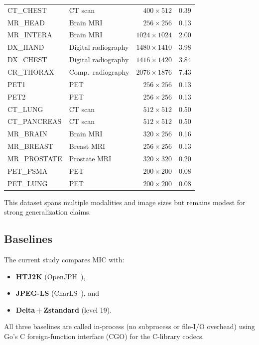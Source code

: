 \documentclass[journal]{IEEEtran}
\begin{document}
\begin{table}[htbp]
\begin{tabular}{llrr}
CT\_CHEST    & CT scan             & $400{\times}512$   & 0.39 \\
MR\_HEAD     & Brain MRI           & $256{\times}256$   & 0.13 \\
MR\_INTERA   & Brain MRI           & $1024{\times}1024$ & 2.00 \\
DX\_HAND     & Digital radiography & $1480{\times}1410$ & 3.98 \\
DX\_CHEST    & Digital radiography & $1416{\times}1420$ & 3.84 \\
CR\_THORAX   & Comp.\ radiography  & $2076{\times}1876$ & 7.43 \\
PET1         & PET                 & $256{\times}256$   & 0.13 \\
PET2         & PET                 & $256{\times}256$   & 0.13 \\
CT\_LUNG     & CT scan             & $512{\times}512$   & 0.50 \\
CT\_PANCREAS & CT scan             & $512{\times}512$   & 0.50 \\
MR\_BRAIN    & Brain MRI           & $320{\times}256$   & 0.16 \\
MR\_BREAST   & Breast MRI          & $256{\times}256$   & 0.13 \\
MR\_PROSTATE & Prostate MRI        & $320{\times}320$   & 0.20 \\
PET\_PSMA    & PET                 & $200{\times}200$   & 0.08 \\
PET\_LUNG    & PET                 & $200{\times}200$   & 0.08 \\
\bottomrule
\end{tabular}
\end{table}

This dataset spans multiple modalities and image sizes but remains modest for
strong generalization claims.

\subsection{Baselines}

The current study compares MIC with:
\begin{itemize}
  \item \textbf{HTJ2K} (OpenJPH~\cite{openjph}),
  \item \textbf{JPEG-LS} (CharLS~\cite{charls}), and
  \item \textbf{Delta\,+\,Zstandard} (level 19).
\end{itemize}

All three baselines are called in-process (no subprocess or file-I/O overhead)
using Go's C foreign-function interface (CGO) for the C-library codecs.
\end{document}
